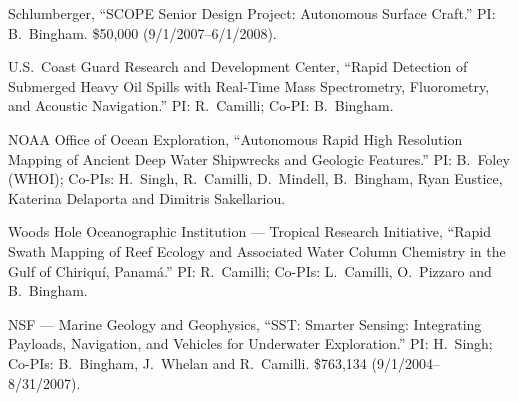 \begin{cvenum}
  \item Schlumberger, ``SCOPE Senior Design Project: Autonomous Surface Craft.'' PI: B.\ Bingham. \$50,000 (9/1/2007--6/1/2008).
  \item U.S.\ Coast Guard Research and Development Center, ``Rapid Detection of Submerged Heavy Oil Spills with Real-Time Mass Spectrometry, Fluorometry, and Acoustic Navigation.'' PI: R.\ Camilli; Co-PI: B.\ Bingham.
  \item NOAA Office of Ocean Exploration, ``Autonomous Rapid High Resolution Mapping of Ancient Deep Water Shipwrecks and Geologic Features.'' PI: B.\ Foley (WHOI); Co-PIs: H.\ Singh, R.\ Camilli, D.\ Mindell, B.\ Bingham, Ryan Eustice, Katerina Delaporta and Dimitris Sakellariou.
  \item Woods Hole Oceanographic Institution --- Tropical Research Initiative, ``Rapid Swath Mapping of Reef Ecology and Associated Water Column Chemistry in the Gulf of Chiriquí, Panamá.'' PI: R.\ Camilli; Co-PIs: L.\ Camilli, O.\ Pizzaro and B.\ Bingham.
  \item NSF --- Marine Geology and Geophysics, ``SST: Smarter Sensing: Integrating Payloads, Navigation, and Vehicles for Underwater Exploration.'' PI: H.\ Singh; Co-PIs: B.\ Bingham, J.\ Whelan and R.\ Camilli. \$763,134 (9/1/2004--8/31/2007).
\end{cvenum}

\printbibliography[keyword=journal, heading=none, resetnumbers=true]

\printbibliography[keyword=nontechnical, heading=none, resetnumbers=true]

\printbibliography[keyword=conference, heading=none, resetnumbers=true]

\printbibliography[keyword=presentation, heading=none, resetnumbers=true]

\printbibliography[keyword=bookchapter, heading=none, resetnumbers=true]

